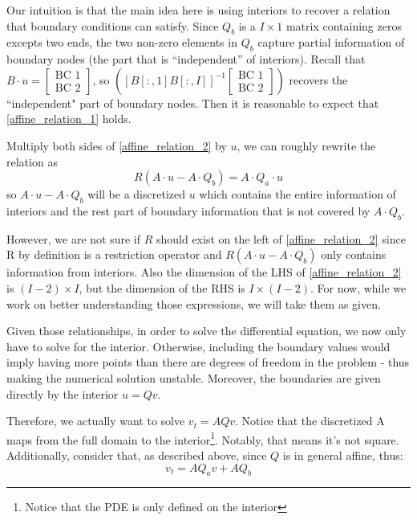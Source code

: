 \documentclass[11pt]{article}
\begin{document}
\begin{itemize}
Our intuition is that the main idea here is using interiors to recover a relation that boundary conditions can %
satisfy. Since $Q_b$ is a $I\times 1$ matrix containing zeros excepts two ends, the two non-zero elements in $Q_b$ capture partial information of boundary nodes (the part that is ``independent'' of interiors).  Recall that $B\cdot u =\begin{bmatrix}
\text{BC 1}\\
\text{BC 2}
\end{bmatrix} $, so $\left([B[:, 1] B[:, I]]^{-1}\begin{bmatrix}
\text{BC 1}\\
\text{BC 2}
\end{bmatrix}\right)$ recovers the ``independent" part of boundary nodes. Then it is reasonable to expect that \eqref{affine_relation_1} holds.

Multiply both sides of \eqref{affine_relation_2} by $u$, we can roughly rewrite the relation as
\begin{equation}
R(A\cdot u-A\cdot Q_b) = A\cdot Q_a\cdot u
\end{equation}
so $A\cdot u-A\cdot Q_b$ will be a discretized $u$ which contains the entire information of interiors and the rest part of boundary information that is not covered by $A\cdot Q_b$. 

However, we are not sure if $R$ should exist on the left of \eqref{affine_relation_2} since R by definition is a restriction operator and $R(A\cdot u-A\cdot Q_b)$ only contains information from interiors. Also the dimension of the LHS of \eqref{affine_relation_2} is $(I-2)\times I$, but the dimension of the RHS is $I\times (I-2)$.
For now, while we work on better understanding those expressions, we will take them as given.

Given those relationships, in order to solve the differential equation, we now only have to solve for the interior. Otherwise, including the boundary values would imply having more points than there are degrees of freedom in the problem - thus making the numerical solution unstable. Moreover, the boundaries are given directly by the interior $u = Qv$. 

Therefore, we actually want to solve $v_t = AQv$. Notice that the discretized A maps from the full domain to the interior\footnote{Notice that the PDE is only defined on the interior}. Notably, that means it's not square. Additionally, consider that, as described above, since $Q$ is in general affine, thus:
\begin{equation}
v_t = AQ_av + AQ_b
\end{equation}


\end{itemize}
\end{document}
